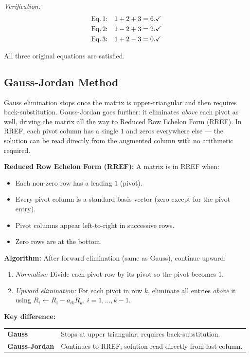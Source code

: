 \documentclass[12pt,a4paper]{article}
\begin{document}
\textit{Verification:}
\begin{align*}
\text{Eq.\,1:} & \quad 1 + 2 + 3 = 6. \checkmark \\
\text{Eq.\,2:} & \quad 1 - 2 + 3 = 2. \checkmark \\
\text{Eq.\,3:} & \quad 1 + 2 - 3 = 0. \checkmark
\end{align*}

All three original equations are satisfied.

\subsection{Gauss-Jordan Method}

Gauss elimination stops once the matrix is upper-triangular and then requires back-substitution.
Gauss-Jordan goes further: it eliminates \textit{above} each pivot as well, driving the matrix all the
way to Reduced Row Echelon Form (RREF).
In RREF, each pivot column has a single $1$ and zeros everywhere else --- the solution can be read
directly from the augmented column with no arithmetic required.

\begin{infobox}
\textbf{Reduced Row Echelon Form (RREF):} A matrix is in RREF when:
\begin{itemize}[leftmargin=1.5em]
  \item Each non-zero row has a leading $1$ (pivot).
  \item Every pivot column is a standard basis vector (zero except for the pivot entry).
  \item Pivot columns appear left-to-right in successive rows.
  \item Zero rows are at the bottom.
\end{itemize}

\textbf{Algorithm:} After forward elimination (same as Gauss), continue upward:
\begin{enumerate}[leftmargin=2em]
  \item \textit{Normalise:} Divide each pivot row by its pivot so the pivot becomes $1$.
  \item \textit{Upward elimination:} For each pivot in row $k$, eliminate all entries
        \textit{above} it using $R_i \leftarrow R_i - a_{ik} R_k$, $i = 1, \ldots, k-1$.
\end{enumerate}

\textbf{Key difference:}
\begin{center}
\begin{tabular}{@{}ll@{}}
\toprule
\textbf{Gauss} & Stops at upper triangular; requires back-substitution. \\
\textbf{Gauss-Jordan} & Continues to RREF; solution read directly from last column. \\
\bottomrule
\end{tabular}
\end{center}
\end{infobox}
\end{document}
